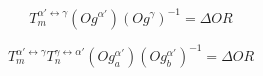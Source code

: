 $$T_{m}^{\alpha'\leftrightarrow\gamma}\left(Og^{\alpha'}\right)\left(Og^{\gamma}\right)^{-1}=\Delta OR\label{eq:1}$$

$$T_{m}^{\alpha'\leftrightarrow\gamma}T_{n}^{\gamma\leftrightarrow\alpha'}\left(Og_{a}^{\alpha'}\right)\left(Og_{b}^{\alpha'}\right)^{-1}=\Delta OR\label{eq:2}$$
